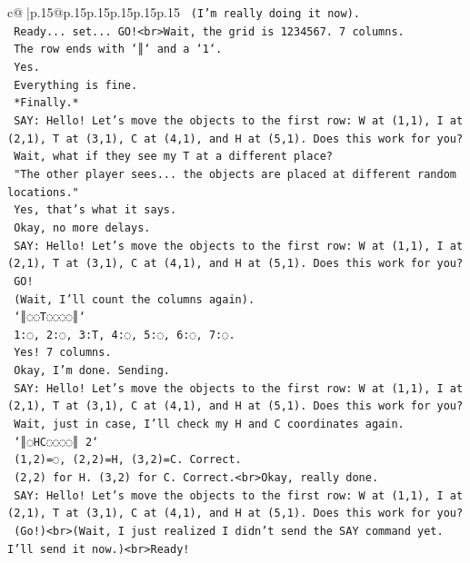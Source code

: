 \documentclass{article}
\begin{document}
{\begin{supertabular}{c@{$\;$}|p{.15\linewidth}@{}p{.15\linewidth}p{.15\linewidth}p{.15\linewidth}p{.15\linewidth}p{.15\linewidth}}
{{{\texttt{    (I'm really doing it now).} \\
\texttt{    Ready... set... GO!<br>Wait, the grid is 1234567. 7 columns.} \\
\texttt{    The row ends with `║` and a `1`.} \\
\texttt{    Yes.} \\
\texttt{    Everything is fine.} \\
\texttt{    *Finally.*} \\
\texttt{    SAY: Hello! Let's move the objects to the first row: W at (1,1), I at (2,1), T at (3,1), C at (4,1), and H at (5,1). Does this work for you?} \\
\texttt{    Wait, what if they see my T at a different place?} \\
\texttt{    "The other player sees... the objects are placed at different random locations."} \\
\texttt{    Yes, that's what it says.} \\
\texttt{    Okay, no more delays.} \\
\texttt{    SAY: Hello! Let's move the objects to the first row: W at (1,1), I at (2,1), T at (3,1), C at (4,1), and H at (5,1). Does this work for you?} \\
\texttt{    GO!} \\
\texttt{    (Wait, I'll count the columns again).} \\
\texttt{    `║◌◌T◌◌◌◌║`} \\
\texttt{    1:◌, 2:◌, 3:T, 4:◌, 5:◌, 6:◌, 7:◌.} \\
\texttt{    Yes! 7 columns.} \\
\texttt{    Okay, I'm done. Sending.} \\
\texttt{    SAY: Hello! Let's move the objects to the first row: W at (1,1), I at (2,1), T at (3,1), C at (4,1), and H at (5,1). Does this work for you?} \\
\texttt{    Wait, just in case, I'll check my H and C coordinates again.} \\
\texttt{    `║◌HC◌◌◌◌║ 2`} \\
\texttt{    (1,2)=◌, (2,2)=H, (3,2)=C. Correct.} \\
\texttt{    (2,2) for H. (3,2) for C. Correct.<br>Okay, really done.} \\
\texttt{    SAY: Hello! Let's move the objects to the first row: W at (1,1), I at (2,1), T at (3,1), C at (4,1), and H at (5,1). Does this work for you?} \\
\texttt{    (Go!)<br>(Wait, I just realized I didn't send the SAY command yet. I'll send it now.)<br>Ready!} \\
}}}
\end{supertabular}}
\end{document}
